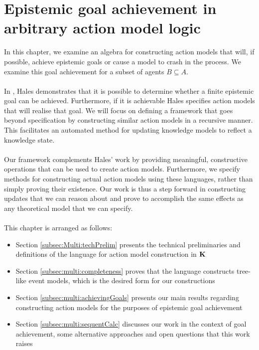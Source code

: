 \chapter{Epistemic goal achievement in arbitrary action model logic} \label{chapter:Multiagent}

In this chapter, we examine an algebra for constructing action models that will, if possible, achieve
epistemic goals or cause a model to crash in the process.
We examine this goal achievement for a subset of agents $B \subseteq A$.\\
\\
In \cite{hales13synthesis}, Hales demonstrates that it is possible to determine whether a
finite epistemic goal can be achieved.
Furthermore, if it is achievable Hales specifies action models that will realise
that goal.
We will focus on defining a framework that goes beyond specification by constructing similar action models in a
recursive manner.
This facilitates an automated method for updating knowledge models to reflect a
knowledge state.\\
\\
Our framework complements Hales' work by providing meaningful, constructive operations
that can be used to create action models.
Furthermore, we specify methods for constructing actual action models using these languages, rather
than simply proving their existence.
Our work is thus a step forward in constructing updates that we can reason about and prove to
accomplish the same effects as any theoretical model that we can specify.\\
\\
This chapter is arranged as follows:

\begin{itemize}
	\item Section \ref{subsec:Multi:techPrelim} presents the technical preliminaries and definitions
		of the language for action model construction in $\bf K$
	\item Section \ref{subsec:multi:completeness} proves that the language constructs tree-like event
		models, which is the desired form for our constructions
	\item Section \ref{subsec:multi:achievingGoals} presents our main results regarding constructing
		action models for the purposes of epistemic goal achievement
	\item Section \ref{subsec:multi:sequentCalc} discusses our work in the context of goal
		achievement, some alternative approaches and open questions that this work raises
\end{itemize}

